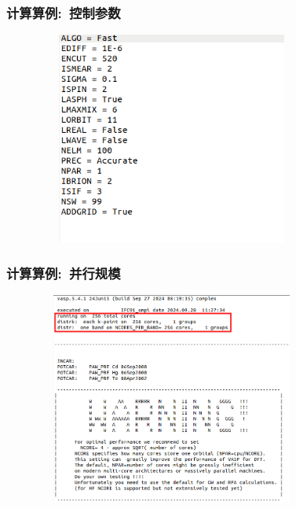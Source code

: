 \frame
{
	\frametitle{计算算例:~控制参数}
\begin{figure}[h!]
\centering
\vskip -0.15in
\includegraphics[height=2.75in,width=3.55in,viewport=0 40 397 366,clip]{Figures/VASP_huge_INCAR.png}
\label{VASP_Contral}
\end{figure} 
}

\frame
{
	\frametitle{计算算例:~并行规模}
\begin{figure}[h!]
\centering
\vskip -0.15in
\includegraphics[height=2.75in,width=3.55in,viewport=0 150 735 645,clip]{Figures/VASP_huge_OUTCAR.png}
\label{VASP_Parallel}
\end{figure} 
}

